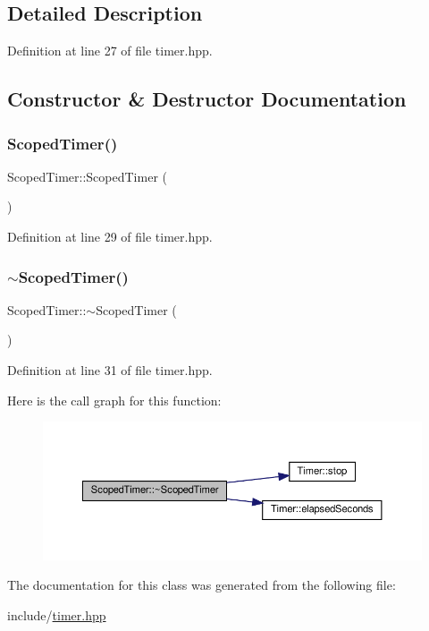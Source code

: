 \subsection{Detailed Description}


Definition at line 27 of file timer.\+hpp.



\subsection{Constructor \& Destructor Documentation}
\mbox{\label{class_scoped_timer_a7bc7d8cca2444b07382d565b321d1f82}} 
\subsubsection{\texorpdfstring{Scoped\+Timer()}{ScopedTimer()}}
{\footnotesize\ttfamily Scoped\+Timer\+::\+Scoped\+Timer (\begin{DoxyParamCaption}{ }\end{DoxyParamCaption})\hspace{0.3cm}{\ttfamily [inline]}}



Definition at line 29 of file timer.\+hpp.

\mbox{\label{class_scoped_timer_a338ced0c8c39fe3d3e89e1b09d29f589}} 
\subsubsection{\texorpdfstring{$\sim$\+Scoped\+Timer()}{~ScopedTimer()}}
{\footnotesize\ttfamily Scoped\+Timer\+::$\sim$\+Scoped\+Timer (\begin{DoxyParamCaption}{ }\end{DoxyParamCaption})\hspace{0.3cm}{\ttfamily [inline]}}



Definition at line 31 of file timer.\+hpp.

Here is the call graph for this function\+:
\nopagebreak
\begin{figure}[H]
\begin{center}
\leavevmode
\includegraphics[width=350pt]{class_scoped_timer_a338ced0c8c39fe3d3e89e1b09d29f589_cgraph}
\end{center}
\end{figure}


The documentation for this class was generated from the following file\+:\begin{DoxyCompactItemize}
\item 
include/\hyperlink{timer_8hpp}{timer.\+hpp}\end{DoxyCompactItemize}
